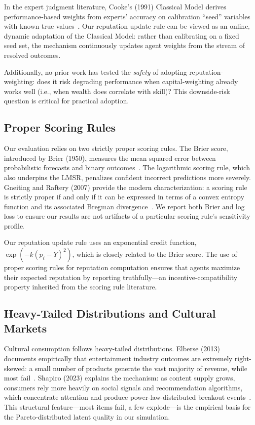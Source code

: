 \documentclass[conference]{IEEEtran}
\begin{document}
In the expert judgment literature, Cooke's (1991) Classical Model derives performance-based weights from experts' accuracy on calibration ``seed'' variables with known true values~\cite{cooke1991}. Our reputation update rule can be viewed as an online, dynamic adaptation of the Classical Model: rather than calibrating on a fixed seed set, the mechanism continuously updates agent weights from the stream of resolved outcomes.

Additionally, no prior work has tested the \emph{safety} of adopting reputation-weighting: does it risk degrading performance when capital-weighting already works well (i.e., when wealth does correlate with skill)? This downside-risk question is critical for practical adoption.

\subsection{Proper Scoring Rules}
\label{sec:related-scoring}

Our evaluation relies on two strictly proper scoring rules. The Brier score, introduced by Brier (1950), measures the mean squared error between probabilistic forecasts and binary outcomes~\cite{brier1950}. The logarithmic scoring rule, which also underpins the LMSR, penalizes confident incorrect predictions more severely. Gneiting and Raftery (2007) provide the modern characterization: a scoring rule is strictly proper if and only if it can be expressed in terms of a convex entropy function and its associated Bregman divergence~\cite{gneiting2007}. We report both Brier and log loss to ensure our results are not artifacts of a particular scoring rule's sensitivity profile.

Our reputation update rule uses an exponential credit function, $\exp(-k(p_i - Y)^2)$, which is closely related to the Brier score. The use of proper scoring rules for reputation computation ensures that agents maximize their expected reputation by reporting truthfully---an incentive-compatibility property inherited from the scoring rule literature.

\subsection{Heavy-Tailed Distributions and Cultural Markets}
\label{sec:related-tails}

Cultural consumption follows heavy-tailed distributions. Elberse (2013) documents empirically that entertainment industry outcomes are extremely right-skewed: a small number of products generate the vast majority of revenue, while most fail~\cite{elberse2013}. Shapiro (2023) explains the mechanism: as content supply grows, consumers rely more heavily on social signals and recommendation algorithms, which concentrate attention and produce power-law-distributed breakout events~\cite{shapiro2023}. This structural feature---most items fail, a few explode---is the empirical basis for the Pareto-distributed latent quality in our simulation.
\end{document}
